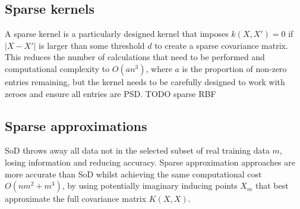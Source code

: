 \subsection{Sparse kernels \cite{big-data}}
A sparse kernel is a particularly designed kernel that imposes $k(X,X') = 0$ if $|X - X'|$ is larger than some threshold $d$ to create a sparse covariance matrix. This reduces the number of calculations that need to be performed and computational complexity to $O(an^3)$, where $a$ is the proportion of non-zero entries remaining, but the kernel needs to be carefully designed to work with zeroes and ensure all entries are PSD. TODO sparse RBF


\subsection{Sparse approximations \cite{big-data}}
SoD throws away all data not in the selected subset of real training data $m$, losing information and reducing accuracy. Sparse approximation approaches are more accurate than SoD whilst achieving the same computational cost $O(nm^2 + m^3)$, by using potentially imaginary inducing points $X_m$ that best approximate the full covariance matrix $K(X,X)$. 

